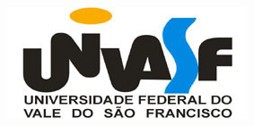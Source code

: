 \begin{capa}
\center
	\includegraphics[scale=0.6]{img/univasf.jpg}

	{\ABNTEXchapterfont\bfseries\large\imprimirinstituicao}

	\vspace*{5cm}
	{\ABNTEXchapterfont\bfseries\large\imprimirautor}

	\vfill
	{\ABNTEXchapterfont\bfseries\large\imprimirtitulo}
	\vfill
	\ABNTEXchapterfont\bfseries\large\imprimirlocal\\ \the\year

	\vspace*{1cm}

\end{capa}

\begin{folhaderosto}
\center
		{\ABNTEXchapterfont\bfseries\large\imprimirautor}
		\vspace*{\fill}

		{\ABNTEXchapterfont\bfseries\large\imprimirtitulo}
		\vspace*{\fill}

		{\hspace{.45\textwidth}
		\begin{minipage}{.5\textwidth}
			\SingleSpacing
			\imprimirpreambulo \\ \\

			{\imprimirorientadorRotulo~\imprimirorientador\par}
			{\imprimircoorientadorRotulo~\imprimircoorientador\par}

		\end{minipage}%
		\vspace*{\fill}}%
		\vspace*{\fill}
			\ABNTEXchapterfont\bfseries\large\imprimirlocal\\ \the\year
		\vspace*{1cm}
\end{folhaderosto}


